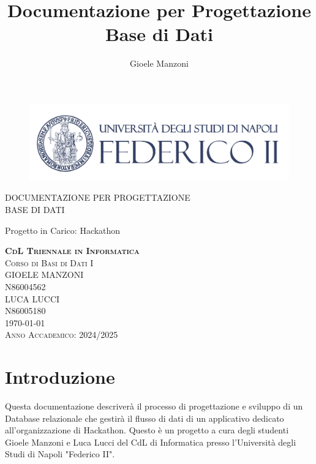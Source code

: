 \documentclass[a4paper, 10pt]{article}
\author{Gioele Manzoni}
\title{Documentazione per Progettazione Base di Dati}
\begin{document}
	\begin{center}
		\begin{figure}[hb]
			\includegraphics[width=1\textwidth]{../Immagini/coverpic.png}
		\end{figure}
		{\LARGE DOCUMENTAZIONE PER PROGETTAZIONE \\BASE DI DATI \par}
		{\Large{Progetto in Carico: Hackathon \par}}
		\vfill
		{\large{\textbf{\textsc{CdL Triennale in Informatica}}}}\\
		{\large{\textsc{Corso di Basi di Dati I}}}\\
		{\large{\textsc{GIOELE MANZONI}}}\\
		{\large{\textsc{N86004562}}}\\
		{\large{\textsc{LUCA LUCCI}}}\\
		{\large{\textsc{N86005180}}}\\
		{\large{\textsc{\today}}}\\
		\Large{\textsc{Anno Accademico: 2024/2025}}
	\end{center}
	\newpage
	\tableofcontents
	\newpage
	\section{Introduzione}
	Questa documentazione descriverà il processo di progettazione e sviluppo di un Database relazionale che gestirà il flusso di dati di un applicativo dedicato all'organizzazione di Hackathon. Questo è un progetto a cura degli studenti Gioele Manzoni e Luca Lucci del CdL di Informatica presso l'Università degli Studi di Napoli "Federico II".
\end{document}
